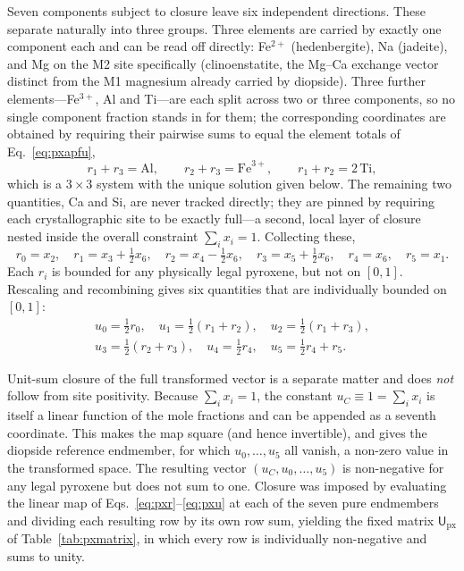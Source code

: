 Seven components subject to closure leave six independent directions. These separate
naturally into three groups. Three elements are carried by exactly one component
each and can be read off directly: Fe$^{2+}$ (hedenbergite), Na (jadeite), and Mg on
the M2 site specifically (clinoenstatite, the Mg--Ca exchange vector distinct from
the M1 magnesium already carried by diopside). Three further elements---Fe$^{3+}$,
Al and Ti---are each split across two or three components, so no single component
fraction stands in for them; the corresponding coordinates are obtained by requiring
their pairwise sums to equal the element totals of Eq.~\eqref{eq:pxapfu},
\begin{equation}
  r_1+r_3 = \mathrm{Al}, \qquad r_2+r_3 = \mathrm{Fe}^{3+}, \qquad
  r_1+r_2 = 2\,\mathrm{Ti},
\end{equation}
which is a $3\times3$ system with the unique solution given below. The remaining two
quantities, Ca and Si, are never tracked directly; they are pinned by requiring each
crystallographic site to be exactly full---a second, local layer of closure nested
inside the overall constraint $\sum_i x_i = 1$. Collecting these,
\begin{equation}
  r_0=x_2,\quad r_1=x_3+\tfrac12 x_6,\quad r_2=x_4-\tfrac12 x_6,\quad
  r_3=x_5+\tfrac12 x_6,\quad r_4=x_6,\quad r_5=x_1 .
  \label{eq:pxr}
\end{equation}
Each $r_i$ is bounded for any physically legal pyroxene, but not on $[0,1]$.
Rescaling and recombining gives six quantities that are individually bounded on
$[0,1]$:
\begin{equation}
  \begin{gathered}
    u_0=\tfrac12 r_0,\quad u_1=\tfrac12(r_1+r_2),\quad u_2=\tfrac12(r_1+r_3),\\
    u_3=\tfrac12(r_2+r_3),\quad u_4=\tfrac12 r_4,\quad u_5=\tfrac12 r_4+r_5 .
  \end{gathered}
  \label{eq:pxu}
\end{equation}

Unit-sum closure of the full transformed vector is a separate matter and
does \emph{not} follow from site positivity. Because $\sum_i x_i = 1$, the constant 
$u_C \equiv 1 = \sum_i x_i$ is itself a linear function of the mole fractions and can 
be appended as a seventh coordinate. This makes the map square (and hence invertible), 
and gives the diopside reference endmember, for which $u_0,\dots,u_5$ all vanish, a non-zero value in the transformed space. 
The resulting vector $(u_C,u_0,\dots,u_5)$ is non-negative for any legal pyroxene but does not sum to one. 
Closure was imposed by evaluating the linear map of
Eqs.~\eqref{eq:pxr}--\eqref{eq:pxu} at each of the seven pure endmembers and dividing
each resulting row by its own row sum, yielding the fixed matrix
$\mathsf{U}_{\mathrm{px}}$ of Table~\ref{tab:pxmatrix}, in which every row is
individually non-negative and sums to unity.

